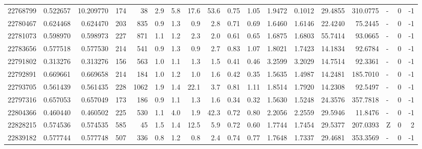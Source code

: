\begin{tabular}{rrrrrrrrrrrrrrrlrr}
  22768799 & 0.522657 &  10.209770 &  174 &   38 &      2.9 &      5.8 &    17.6 &     53.6 &       0.75 &        1.05 &  1.9472 &  0.1012 &   29.4855 &  310.0775 &             - &        0 &         -1 \\
  22780467 & 0.624468 &   0.624470 &  203 &  835 &      0.9 &      1.3 &     0.9 &      2.8 &       0.71 &        0.69 &  1.6460 &  1.6146 &   22.4240 &   75.2445 &             - &        0 &         -1 \\
  22781073 & 0.598970 &   0.598973 &  227 &  871 &      1.1 &      1.2 &     2.3 &      2.0 &       0.61 &        0.65 &  1.6875 &  1.6803 &   55.7414 &   93.0665 &             - &        0 &         -1 \\
  22783656 & 0.577518 &   0.577530 &  214 &  541 &      0.9 &      1.3 &     0.9 &      2.7 &       0.83 &        1.07 &  1.8021 &  1.7423 &   14.1834 &   92.6784 &             - &        0 &         -1 \\
  22791802 & 0.313276 &   0.313276 &  156 &  563 &      1.0 &      1.1 &     1.3 &      1.5 &       0.41 &        0.46 &  3.2599 &  3.2029 &   14.7514 &   92.3361 &             - &        0 &         -1 \\
  22792891 & 0.669661 &   0.669658 &  214 &  184 &      1.0 &      1.2 &     1.0 &      1.6 &       0.42 &        0.35 &  1.5635 &  1.4987 &   14.2481 &  185.7010 &             - &        0 &         -1 \\
  22793705 & 0.561439 &   0.561435 &  228 & 1062 &      1.9 &      1.4 &    22.1 &      3.7 &       0.81 &        1.11 &  1.8514 &  1.7920 &   14.2308 &   92.5497 &             - &        0 &         -1 \\
  22797316 & 0.657053 &   0.657049 &  173 &  186 &      0.9 &      1.1 &     1.3 &      1.6 &       0.34 &        0.32 &  1.5630 &  1.5248 &   24.3576 &  357.7818 &             - &        0 &         -1 \\
  22804366 & 0.460440 &   0.460502 &  225 &  530 &      1.1 &      4.0 &     1.9 &     42.3 &       0.72 &        0.80 &  2.2056 &  2.2559 &   29.5946 &   11.8476 &             - &        0 &         -1 \\
  22828215 & 0.574536 &   0.574535 &  585 &   45 &      1.5 &      1.4 &    12.5 &      5.9 &       0.72 &        0.60 &  1.7744 &  1.7454 &   29.5377 &  207.0393 &             Z &        0 &          2 \\
  22839182 & 0.577744 &   0.577748 &  507 &  336 &      0.8 &      1.2 &     0.8 &      2.4 &       0.74 &        0.77 &  1.7648 &  1.7337 &   29.4681 &  353.3569 &             - &        0 &         -1 \\

\end{tabular}
